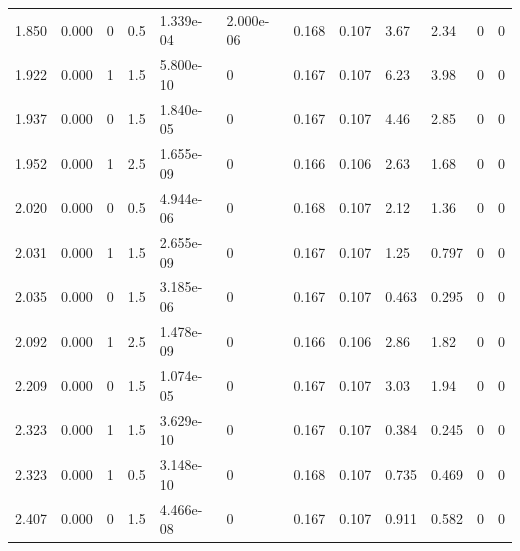 \documentclass[preview]{standalone}
\begin{document}
{{\begin{tabular}{L{1.2cm}C{1.2cm} C{0.3cm}C{0.5cm} C{1.4cm}C{1.4cm} C{1.4cm}C{1.4cm} C{1.6cm}C{1.6cm} C{1.6cm}C{1.6cm}}
  1.850  &  0.000  & 0     & 0.5 &  1.339e-04  & 2.000e-06  &  0.168&   0.107& 3.67 & 2.34   &  0 & 0  \\ 
  1.922  &  0.000  & 1     & 1.5 &  5.800e-10  & 0  &  0.167&   0.107& 6.23 & 3.98   &  0 & 0  \\ 
  1.937  &  0.000  & 0     & 1.5 &  1.840e-05  & 0  &  0.167&   0.107& 4.46 & 2.85   &  0 & 0  \\ 
  1.952  &  0.000  & 1     & 2.5 &  1.655e-09  & 0  &  0.166&   0.106& 2.63 & 1.68   &  0 & 0  \\ 
  2.020  &  0.000  & 0     & 0.5 &  4.944e-06  & 0  &  0.168&   0.107& 2.12 & 1.36   &  0 & 0  \\ 
  2.031  &  0.000  & 1     & 1.5 &  2.655e-09  & 0  &  0.167&   0.107& 1.25 & 0.797   &  0 & 0  \\ 
  2.035  &  0.000  & 0     & 1.5 &  3.185e-06  & 0  &  0.167&   0.107& 0.463 & 0.295   &  0 & 0  \\ 
  2.092  &  0.000  & 1     & 2.5 &  1.478e-09  & 0  &  0.166&   0.106& 2.86 & 1.82   &  0 & 0  \\ 
  2.209  &  0.000  & 0     & 1.5 &  1.074e-05  & 0  &  0.167&   0.107& 3.03 & 1.94   &  0 & 0  \\ 
  2.323  &  0.000  & 1     & 1.5 &  3.629e-10  & 0  &  0.167&   0.107& 0.384 & 0.245   &  0 & 0  \\ 
  2.323  &  0.000  & 1     & 0.5 &  3.148e-10  & 0  &  0.168&   0.107& 0.735 & 0.469   &  0 & 0  \\ 
  2.407  &  0.000  & 0     & 1.5 &  4.466e-08  & 0  &  0.167&   0.107& 0.911 & 0.582   &  0 & 0  \\ 
\hline 
\end{tabular} 

}}
\end{document}
